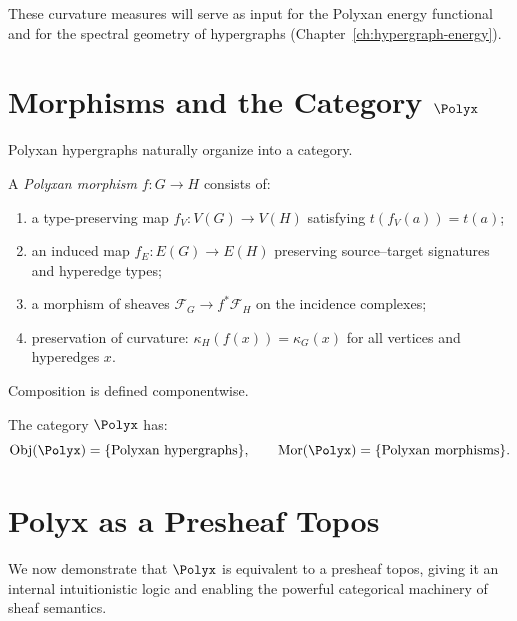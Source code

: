 These curvature measures will serve as input for the Polyxan energy functional
and for the spectral geometry of hypergraphs (Chapter~\ref{ch:hypergraph-energy}).

\section{Morphisms and the Category \texorpdfstring{$\Polyx$}{Polyx}}
\label{sec:polyx-category}

Polyxan hypergraphs naturally organize into a category.

\begin{definition}[Morphisms]
A \emph{Polyxan morphism} $f : G \to H$ consists of:
\begin{enumerate}
  \item a type-preserving map $f_V : V(G) \to V(H)$ satisfying
        $t(f_V(a)) = t(a)$;
  \item an induced map $f_E : E(G) \to E(H)$ preserving source--target
        signatures and hyperedge types;
  \item a morphism of sheaves $\mathscr{F}_G \to f^\ast\mathscr{F}_H$ on the
        incidence complexes;
  \item preservation of curvature: $\kappa_H(f(x)) = \kappa_G(x)$ for all
        vertices and hyperedges $x$.
\end{enumerate}
Composition is defined componentwise.
\end{definition}

\begin{definition}
The category $\Polyx$ has:
\[
\mathrm{Obj}(\Polyx) = \{ \text{Polyxan hypergraphs} \},
\qquad
\mathrm{Mor}(\Polyx) = \{ \text{Polyxan morphisms} \}.
\]
\end{definition}

\section{Polyx as a Presheaf Topos}

We now demonstrate that $\Polyx$ is equivalent to a presheaf topos, giving it
an internal intuitionistic logic and enabling the powerful categorical
machinery of sheaf semantics.

